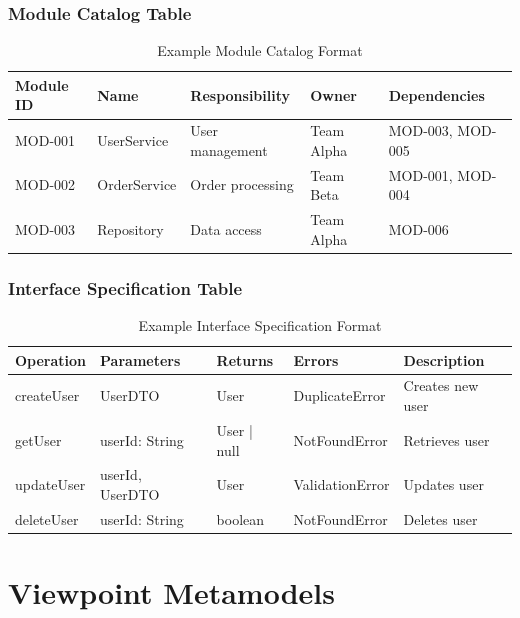 \documentclass[11pt,letterpaper]{article}
\begin{document}
\subsubsection{Module Catalog Table}

\begin{table}[H]
\centering
\caption{Example Module Catalog Format}
\small
\begin{tabular}{@{}L{2.2cm}L{2.5cm}L{3cm}L{2.5cm}L{3cm}@{}}
\toprule
\textbf{Module ID} & \textbf{Name} & \textbf{Responsibility} & \textbf{Owner} & \textbf{Dependencies} \\
\midrule
MOD-001 & UserService & User management & Team Alpha & MOD-003, MOD-005 \\
MOD-002 & OrderService & Order processing & Team Beta & MOD-001, MOD-004 \\
MOD-003 & Repository & Data access & Team Alpha & MOD-006 \\
\bottomrule
\end{tabular}
\end{table}

\subsubsection{Interface Specification Table}

\begin{table}[H]
\centering
\caption{Example Interface Specification Format}
\small
\begin{tabular}{@{}L{2.3cm}L{2.5cm}L{1.8cm}L{2.8cm}L{\dimexpr\linewidth-9.4cm-8\tabcolsep\relax}@{}}
\toprule
\textbf{Operation} & \textbf{Parameters} & \textbf{Returns} & \textbf{Errors} & \textbf{Description} \\
\midrule
createUser & UserDTO & User & DuplicateError & Creates new user \\
getUser & userId: String & User | null & NotFoundError & Retrieves user \\
updateUser & userId, UserDTO & User & ValidationError & Updates user \\
deleteUser & userId: String & boolean & NotFoundError & Deletes user \\
\bottomrule
\end{tabular}
\end{table}

\section{Viewpoint Metamodels}
\end{document}
